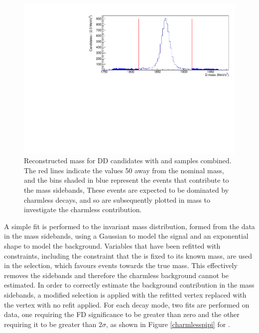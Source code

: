 \begin{figure}
\centering
\includegraphics[width=0.8\linewidth]{figures/backgrounds/Dsidebands.pdf}
\caption{Reconstructed \Dz mass for \kpi DD candidates with \runone and \runtwo samples combined. The red lines indicate the values 50 \mevcc away from the nominal \Dz mass, and the bins shaded in blue represent the events that contribute to the \Dz mass sidebands, These events are expected to be dominated by charmless decays, and so are subsequently plotted in \Bm mass to investigate the charmless contribution.}
\label{Dsidebands}
\end{figure}

A simple fit is performed to the invariant \B mass distribution, formed from the data in the \Dz mass sidebands, using a Gaussian to model the signal and an exponential shape to model the background. Variables that have been refitted with constraints, including the constraint that the \Dz is fixed to its known mass, are used in the selection, which favours events towards the true \Dz mass. This effectively removes the \Dz sidebands and therefore the charmless background cannot be estimated. In order to correctly estimate the background contribution in the \Dz mass sidebands, a modified selection is applied with the refitted vertex \chisq replaced with the vertex \chisq with no refit applied. For each \Dz decay mode, two fits are performed on data, one requiring the \Dz FD significance to be greater than zero and the other requiring it to be greater than 2$\sigma$, as shown in Figure \ref{charmlesspipi} for \pipi.

